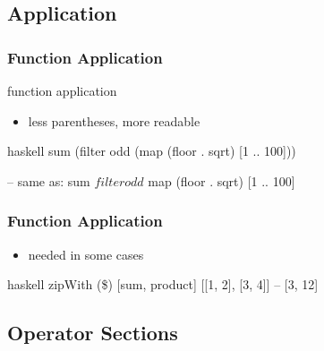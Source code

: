 \documentclass[dvipsnames]{beamer}
\theoremstyle{plain}
\begin{document}
\subsection{Application}

\begin{frame}[fragile]
  \frametitle{Function Application}

  \begin{block}{function application}
  \end{block}

  \begin{itemize}
    \item less parentheses, more readable
  \end{itemize}

  \begin{exampleblock}{}
    \begin{pygments}{haskell}
sum (filter odd (map (floor . sqrt) [1 .. 100]))

-- same as:
sum $ filter odd $ map (floor . sqrt) [1 .. 100]
    \end{pygments}
  \end{exampleblock}
\end{frame}

\begin{frame}[fragile]
  \frametitle{Function Application}

  \begin{itemize}
    \item needed in some cases
  \end{itemize}

  \begin{exampleblock}{}
    \begin{pygments}{haskell}
zipWith (\$) [sum, product] [[1, 2], [3, 4]]
-- [3, 12]
    \end{pygments}
  \end{exampleblock}
\end{frame}

\subsection{Operator Sections}
\end{document}
